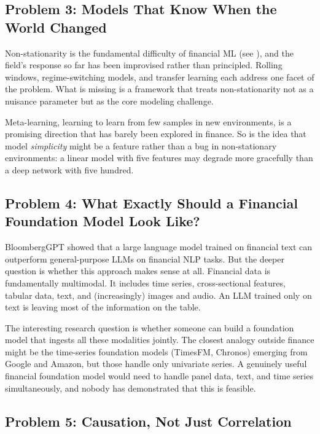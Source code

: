 \subsection{Problem 3: Models That Know When the World Changed}

Non-stationarity is the fundamental difficulty of financial ML (see ), and the field's response so far has been improvised rather than principled. Rolling windows, regime-switching models, and transfer learning each address one facet of the problem. What is missing is a framework that treats non-stationarity not as a nuisance parameter but as the core modeling challenge.

Meta-learning, learning to learn from few samples in new environments, is a promising direction that has barely been explored in finance. So is the idea that model \textit{simplicity} might be a feature rather than a bug in non-stationary environments: a linear model with five features may degrade more gracefully than a deep network with five hundred.

\subsection{Problem 4: What Exactly Should a Financial Foundation Model Look Like?}

BloombergGPT \citep{Wu2023} showed that a large language model trained on financial text can outperform general-purpose LLMs on financial NLP tasks. But the deeper question is whether this approach makes sense at all. Financial data is fundamentally multimodal. It includes time series, cross-sectional features, tabular data, text, and (increasingly) images and audio. An LLM trained only on text is leaving most of the information on the table.

The interesting research question is whether someone can build a foundation model that ingests all these modalities jointly. The closest analogy outside finance might be the time-series foundation models (TimesFM, Chronos) emerging from Google and Amazon, but those handle only univariate series. A genuinely useful financial foundation model would need to handle panel data, text, and time series simultaneously, and nobody has demonstrated that this is feasible.

\subsection{Problem 5: Causation, Not Just Correlation}

